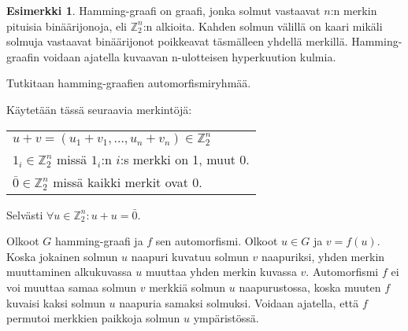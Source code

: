 \documentclass[a4paper, 12pt]{article}
\theoremstyle{definition}
\newtheorem{example}[mydef]{Esimerkki}
\theoremstyle{plain}
\begin{document}
\begin{example}
Hamming-graafi on graafi, jonka solmut vastaavat $n$:n merkin pituisia binäärijonoja, eli $\mathbb{Z}_2^n$:n alkioita. Kahden solmun välillä on kaari mikäli solmuja vastaavat binäärijonot poikkeavat täsmälleen yhdellä merkillä. Hamming-graafin voidaan ajatella kuvaavan n-ulotteisen hyperkuution kulmia.

\begin{center}
\end{center}

Tutkitaan hamming-graafien automorfismiryhmää.

Käytetään tässä seuraavia merkintöjä:
\begin{center}
\begin{tabular}{l}
$u + v = (u_1 + v_1, \dots, u_n + v_n) \in \mathbb{Z}_2^n$\\
$1_i \in \mathbb{Z}_2^n$ missä $1_i$:n $i$:s merkki on 1, muut 0.\\
$\bar{0} \in \mathbb{Z}_2^n$ missä kaikki merkit ovat 0.
\end{tabular}
\end{center}
Selvästi $ \forall u \in \mathbb{Z}_2^n: u + u = \bar{0}$.

Olkoot $G$ hamming-graafi ja $f$ sen automorfismi. Olkoot $u \in G$ ja $v = f(u)$. Koska jokainen solmun $u$ naapuri kuvatuu solmun $v$ naapuriksi, yhden merkin muuttaminen alkukuvassa $u$ muuttaa yhden merkin kuvassa $v$. Automorfismi $f$ ei voi muuttaa samaa solmun $v$ merkkiä solmun $u$ naapurustossa, koska muuten $f$ kuvaisi kaksi solmun $u$ naapuria samaksi solmuksi. Voidaan ajatella, että $f$ permutoi merkkien paikkoja solmun $u$ ympäristössä. 


\end{example}
\end{document}
